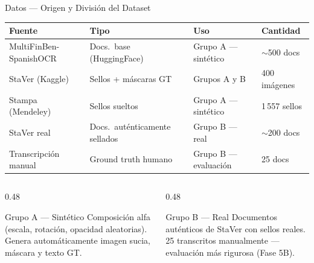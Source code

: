 \documentclass[aspectratio=169, 11pt]{beamer}
\begin{document}
\begin{frame}{Datos — Origen y División del Dataset}
  \scriptsize
  \begin{tabular}{@{}llll@{}}
    \toprule
    \textbf{Fuente} & \textbf{Tipo} & \textbf{Uso} & \textbf{Cantidad} \\
    \midrule
    MultiFinBen-SpanishOCR & Docs.\ base (HuggingFace)  & Grupo A — sintético  & $\sim$500 docs \\
    StaVer (Kaggle)        & Sellos + máscaras GT        & Grupos A y B         & 400 imágenes   \\
    Stampa (Mendeley)      & Sellos sueltos              & Grupo A — sintético  & 1\,557 sellos  \\
    StaVer real            & Docs.\ auténticamente sellados & Grupo B — real    & $\sim$200 docs \\
    Transcripción manual   & Ground truth humano         & Grupo B — evaluación & 25 docs        \\
    \bottomrule
  \end{tabular}

  \vspace{10pt}

  \vspace{8pt}
  \begin{columns}[T]
    \begin{column}{0.48\textwidth}
      \begin{block}{Grupo A — Sintético}
        \scriptsize Composición alfa (escala, rotación, opacidad aleatorias).
        Genera automáticamente imagen sucia, máscara y texto GT.
      \end{block}
    \end{column}
    \begin{column}{0.48\textwidth}
      \begin{block}{Grupo B — Real}
        \scriptsize Documentos auténticos de StaVer con sellos reales.
        25 transcritos manualmente — evaluación más rigurosa (Fase 5B).
      \end{block}
    \end{column}
  \end{columns}
\end{frame}
\end{document}
